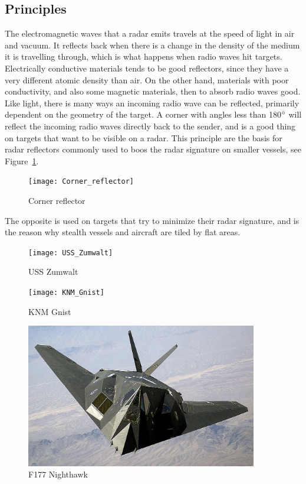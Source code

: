 \subsection{Principles}
The electromagnetic waves that a radar emits travels at the speed of light in air and vacuum. It reflects back when there is a change in the density of the medium it is travelling through, which is what happens when radio waves hit targets. Electrically conductive materials tends to be good reflectors, since they have a very different atomic density than air. On the other hand, materials with poor conductivity, and also some magnetic materials, then to absorb radio waves good. Like light, there is many ways an incoming radio wave can be reflected, primarily dependent on the geometry of the target. A corner with angles less than 180$\degree$ will reflect the incoming radio waves directly back to the sender, and is a good thing on targets that want to be visible on a radar. This principle are the basis for radar reflectors commonly used to boos the radar signature on smaller vessels, see Figure~\ref{fig:corner_reflector}.
\begin{figure}
\centering
\texttt{[image: Corner\_reflector]}
\caption{Corner reflector}
\label{fig:corner_reflector}
\end{figure}
The opposite is used on targets that try to minimize their radar signature, and is the reason why stealth vessels and aircraft are tiled by flat areas. 
\begin{figure}
\centering
\begin{minipage}{0.3\textwidth}
\texttt{[image: USS\_Zumwalt]}
\caption{USS Zumwalt}
\label{fig:uss_zumwalt}
\end{minipage}\hfill
\begin{minipage}{0.3\textwidth}
\texttt{[image: KNM\_Gnist]}
\caption{KNM Gnist}
\label{fig:knm_gnist}
\end{minipage}\hfill
\begin{minipage}{0.3\textwidth}
\includegraphics[width=0.9\textwidth]{Figures/F-117_Nighthawk}
\caption{F177 Nighthawk}
\label{fig:f177_nighthawk}
\end{minipage}
\end{figure}

